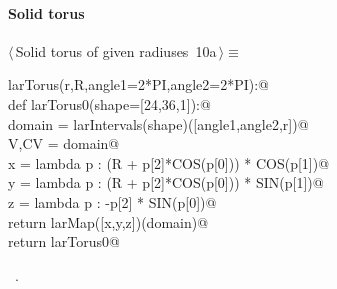 \documentclass[11pt,oneside]{article}	%
\begin{document}
\paragraph{Solid torus}
\begin{flushleft} \small \label{scrap20}
\protect{}$\langle\,$Solid torus of given radiuses\nobreak\ {\footnotesize 10a}$\,\rangle\equiv$
\vspace{-1ex}
\begin{list}{}{} \item
\mbox{}\verb@def larTorus(r,R,angle1=2*PI,angle2=2*PI):@\\
\mbox{}\verb@   def larTorus0(shape=[24,36,1]):@\\
\mbox{}\verb@      domain = larIntervals(shape)([angle1,angle2,r])@\\
\mbox{}\verb@      V,CV = domain@\\
\mbox{}\verb@      x = lambda p : (R + p[2]*COS(p[0])) * COS(p[1])@\\
\mbox{}\verb@      y = lambda p : (R + p[2]*COS(p[0])) * SIN(p[1])@\\
\mbox{}\verb@      z = lambda p : -p[2] * SIN(p[0])@\\
\mbox{}\verb@      return larMap([x,y,z])(domain)@\\
\mbox{}\verb@   return larTorus0@\\
\mbox{}\verb@@{\NWsep}
\end{list}
\vspace{-1ex}
\footnotesize\addtolength{\baselineskip}{-1ex}
\begin{list}{}{\setlength{\itemsep}{-\parsep}\setlength{\itemindent}{-\leftmargin}}
\item \NWtxtMacroRefIn\ .
\end{list}
\end{flushleft}
\end{document}

